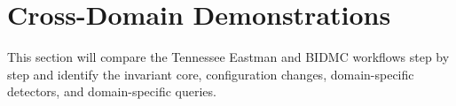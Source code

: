 \section{Cross-Domain Demonstrations}

This section will compare the Tennessee Eastman and BIDMC workflows step by step and identify the invariant core, configuration changes, domain-specific detectors, and domain-specific queries.
